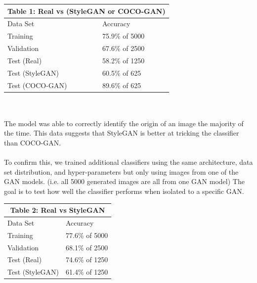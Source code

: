 \documentclass[12pt]{article}
\begin{document}
\begin{multicols*}{2}
        \begin{tabular}{ |p{4cm}|p{3cm}|  }
         \hline
         \multicolumn{2}{|c|}{Table 1: Real vs (StyleGAN or COCO-GAN)} \\
         \hline
        Data Set     & Accuracy\\
         \hline
        Training        & 75.9\% of 5000 \\
         \hline
        Validation      & 67.6\% of 2500 \\
         \hline
        Test (Real)     & 58.2\% of 1250 \\
         \hline
        Test (StyleGAN) & 60.5\% of 625  \\
         \hline
        Test (COCO-GAN) & 89.6\% of 625 \\
         \hline
        \end{tabular}
        \\\\
        The model was able to correctly identify the origin of an image the majority of the time.
        This data suggests that StyleGAN is better at tricking the classifier than COCO-GAN.
        \\\\
        To confirm this, we trained additional classifiers using the same architecture, data set distribution, and hyper-parameters but only using images from one of the GAN models.
        (i.e. all 5000 generated images are all from one GAN model)
        The goal is to test how well the classifier performs when isolated to a specific GAN.

        \begin{tabular}{ |p{4cm}|p{3cm}|  }
             \hline
             \multicolumn{2}{|c|}{Table 2: Real vs StyleGAN} \\
             \hline
            Data Set     & Accuracy\\
             \hline
            Training        & 77.6\% of 5000 \\
             \hline
            Validation      & 68.1\% of 2500 \\
             \hline
            Test (Real)     & 74.6\% of 1250 \\
             \hline
            Test (StyleGAN) & 61.4\% of 1250  \\
             \hline
        \end{tabular}
        \\


\end{multicols*}
\end{document}
